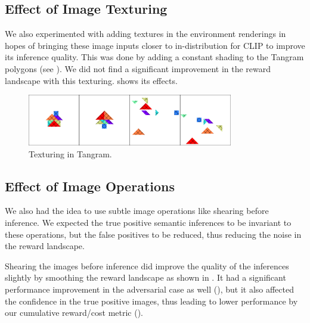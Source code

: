 
\subsection{Effect of Image Texturing}
\label{sec:image-texturing}
We also experimented with adding textures in the environment renderings
in hopes of bringing these image inputs closer to in-distribution for CLIP to improve its inference quality.
This was done by adding a constant shading to the Tangram polygons (see ).
We did not find a significant improvement in the reward landscape with this texturing.
 shows its effects.

\begin{figure}[H]
    \centering
    \includegraphics[width=0.8\textwidth]{images/hatched.pdf}
    \caption{Texturing in Tangram.}
    \label{fig:texturing}
\end{figure}

\subsection{Effect of Image Operations}
\label{sec:image-operations}
We also had the idea to use subtle image operations like shearing before inference.
We expected the true positive semantic inferences to be invariant to these operations, but the false positives to be reduced, thus reducing the noise in the reward landscape.

Shearing the images before inference did improve the quality of the inferences slightly by smoothing the reward landscape as shown in .
It had a significant performance improvement in the adversarial case as well (), but it also affected the confidence in the true positive images, thus leading to lower performance by our cumulative reward/cost metric ().


